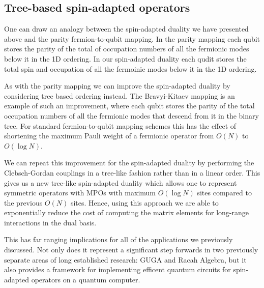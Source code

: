 \documentclass{article}
\begin{document}
\subsection{Tree-based spin-adapted operators}
One can draw an analogy between the spin-adapted duality we have presented above and the parity fermion-to-qubit mapping. In the parity mapping each qubit stores the parity of the total of occupation numbers of all the fermionic modes below it in the 1D ordering. In our spin-adapted duality each qudit stores the total spin and occupation of all the fermoinic modes below it in the 1D ordering. 

As with the parity mapping we can improve the spin-adapted duality by considering tree based ordering instead. The Bravyi-Kitaev mapping is an example of such an improvement, where each qubit stores the parity of the total occupation numbers of all the fermionic modes that descend from it in the binary tree. For standard fermion-to-qubit mapping schemes this has the effect of shortening the maximum Pauli weight of a fermionic operator from $O(N)$ to $O(\log N)$.

We can repeat this improvement for the spin-adapted duality by performing the Clebsch-Gordan couplings in a tree-like fashion rather than in a linear order. This gives us a new tree-like spin-adapted duality which allows one to represent symmetric operators with MPOs with maximum $O(\log N)$ sites compared to the previous $O(N)$ sites. Hence, using this approach we are able to exponentially reduce the cost of computing the matrix elements for long-range interactions in the dual basis.

This has far ranging implications for all of the applications we previously discussed. Not only does it represent a significant step forwards in two previously separate areas of long established research: GUGA and Racah Algebra, but it also provides a framework for implementing efficent quantum circuits for spin-adapted operators on a quantum computer.



\end{document}
